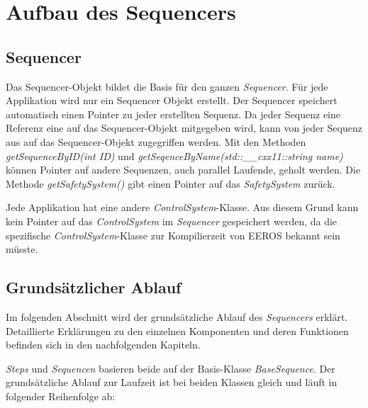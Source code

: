 \chapter{Aufbau des Sequencers}

\section{Sequencer}
Das Sequencer-Objekt bildet die Basis für den ganzen \textit{Sequencer}.
Für jede Applikation wird nur ein Sequencer Objekt erstellt.
Der Sequencer speichert automatisch einen Pointer zu jeder erstellten Sequenz.
Da jeder Sequenz eine Referenz eine auf das Sequencer-Objekt mitgegeben wird, kann von jeder Sequenz aus auf das Sequencer-Objekt zugegriffen werden.
Mit den Methoden \textit{getSequenceByID(int ID)} und \textit{getSeqenceByName(std::\_\_cxx11::string name)} können Pointer auf andere Sequenzen, auch parallel Laufende, geholt werden.
Die Methode \textit{getSafetySystem()} gibt einen Pointer auf das \textit{SafetySystem} zurück.

Jede Applikation hat eine andere \textit{ControlSystem}-Klasse.
Aus diesem Grund kann kein Pointer auf das \textit{ControlSystem} im \textit{Sequencer} gespeichert werden, da die spezifische \textit{ControlSystem}-Klasse zur Kompilierzeit von EEROS bekannt sein müsste.



\section{Grundsätzlicher Ablauf}
Im folgenden Abschnitt wird der grundsätzliche Ablauf des \textit{Sequencers} erklärt.
Detaillierte Erklärungen zu den einzelnen Komponenten und deren Funktionen befinden sich in den nachfolgenden Kapiteln.

\textit{Steps} und \textit{Sequencen} basieren beide auf der Basis-Klasse \textit{BaseSequence}.
Der grundsätzliche Ablauf zur Laufzeit ist bei beiden Klassen gleich und läuft in folgender Reihenfolge ab:

